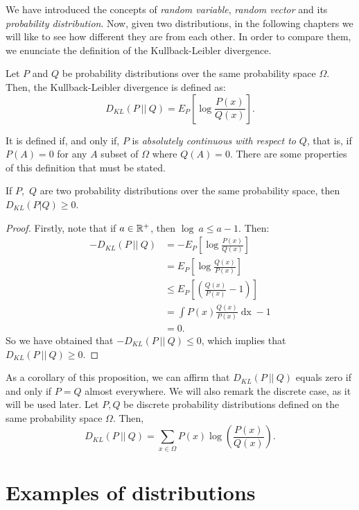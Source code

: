We have introduced the concepts of \emph{random variable},  \emph{random vector} and its \emph{probability distribution}.
Now, given two distributions, in the following chapters we will like to see how different they are from each other.
In order to compare them, we enunciate the definition of the Kullback-Leibler divergence.

\begin{ndef}
Let $P$ and $Q$ be probability distributions over the same probability space $\Omega$. Then, the Kullback-Leibler divergence is defined as:
$$
D_{KL}(P \ || \ Q) = E_P\left[\log{\frac{P(x)}{Q(x)}}\right].
$$
\end{ndef}
It is defined if, and only if, $P$ is \emph{absolutely continuous with respect to} $Q$, that is, if $P(A) = 0$ for any $A$ subset of $\Omega$ where $Q(A) = 0$.
 There are some properties of this definition that must be stated. 

\begin{nprop}
If $P,$ $Q$ are two probability distributions over the same probability space, then $D_{KL}(P|Q) \geq 0$.
\end{nprop}
\begin{proof}
Firstly, note that if $a \in \mathbb{R}^+$, then $\log \ a \leq a-1$. Then:
\begin{align*}
-D_{KL}(P \ || \ Q) & = - E_P\left[\log{\frac{P(x)}{Q(x)}}\right] \\
             & = E_P\left[\log{\frac{Q(x)}{P(x)}}\right] \\
             & \leq E_P\left[\left(\frac{Q(x)}{P(x)} - 1\right)\right]\\
             & = \int P(x) \frac{Q(x)}{P(x)} \mathop{dx} -1 \\
             & = 0.
\end{align*}
So we have obtained that $-D_{KL}(P\ ||\ Q) \leq 0$, which implies that $D_{KL}(P\ || \ Q) \geq 0$.
\end{proof}
As a corollary of this proposition, we can affirm that $D_{KL}(P\ ||\ Q)$ equals zero if and only if $P = Q$ almost everywhere. 
We will also remark the discrete case, as it will be used later. Let $P,Q$ be discrete probability distributions defined on the same probability space $\Omega$. Then, 
$$
D_{KL}(P\ ||\ Q) = \sum_{x \in \Omega} P(x) \log \left( \frac{P(x)}{Q(x)}\right).
$$

\section{Examples of distributions}

